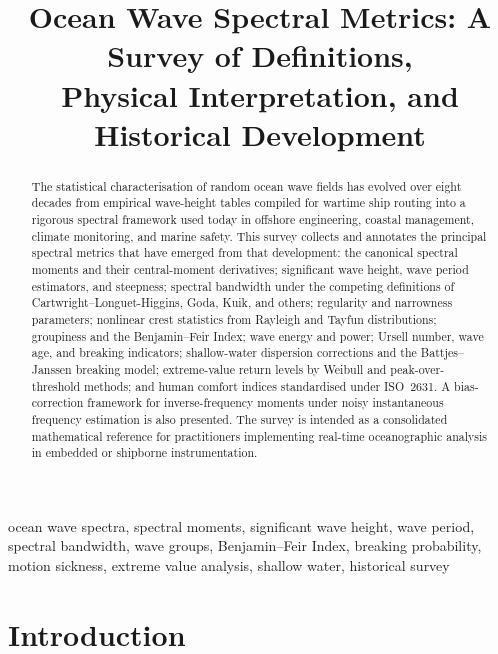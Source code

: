 \documentclass[journal]{IEEEtran}
\title{Ocean Wave Spectral Metrics: A Survey of Definitions,\\
Physical Interpretation, and Historical Development}
\author{%
    \IEEEauthorblockN{Mikhail S.\ Grushinskiy}
    \IEEEauthorblockA{Independent Researcher,
        Bareboat Necessities Project,
        \texttt{mgrouch@users.github.com}}
}
\begin{document}
    \maketitle

    \begin{abstract}
        The statistical characterisation of random ocean wave fields has
        evolved over eight decades from empirical wave-height tables compiled
        for wartime ship routing into a rigorous spectral framework used today
        in offshore engineering, coastal management, climate monitoring, and
        marine safety.
        This survey collects and annotates the principal spectral metrics that
        have emerged from that development: the canonical spectral moments and
        their central-moment derivatives; significant wave height, wave period
        estimators, and steepness; spectral bandwidth under the competing
        definitions of Cartwright--Longuet-Higgins, Goda, Kuik, and others;
        regularity and narrowness parameters; nonlinear crest statistics from
        Rayleigh and Tayfun distributions; groupiness and the Benjamin--Feir
        Index; wave energy and power; Ursell number, wave age, and breaking
        indicators; shallow-water dispersion corrections and the
        Battjes--Janssen breaking model; extreme-value return levels by
        Weibull and peak-over-threshold methods; and human comfort indices
        standardised under ISO~2631.
        A bias-correction framework for inverse-frequency moments under noisy
        instantaneous frequency estimation is also presented.
        The survey is intended as a consolidated mathematical reference for
        practitioners implementing real-time oceanographic analysis in embedded
        or shipborne instrumentation.
    \end{abstract}


    \begin{IEEEkeywords}
        ocean wave spectra, spectral moments, significant wave height,
        wave period, spectral bandwidth, wave groups, Benjamin--Feir Index,
        breaking probability, motion sickness, extreme value analysis,
        shallow water, historical survey
    \end{IEEEkeywords}

    \section{Introduction}
\end{document}
